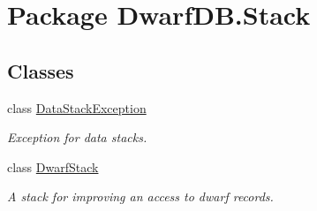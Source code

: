 \hypertarget{namespace_dwarf_d_b_1_1_stack}{
\section{Package DwarfDB.Stack}
\label{namespace_dwarf_d_b_1_1_stack}
}
\subsection*{Classes}
\begin{DoxyCompactItemize}
\item 
class \hyperlink{class_dwarf_d_b_1_1_stack_1_1_data_stack_exception}{DataStackException}
\begin{DoxyCompactList}\small\item\em Exception for data stacks. \item\end{DoxyCompactList}\item 
class \hyperlink{class_dwarf_d_b_1_1_stack_1_1_dwarf_stack}{DwarfStack}
\begin{DoxyCompactList}\small\item\em A stack for improving an access to dwarf records. \item\end{DoxyCompactList}\end{DoxyCompactItemize}
